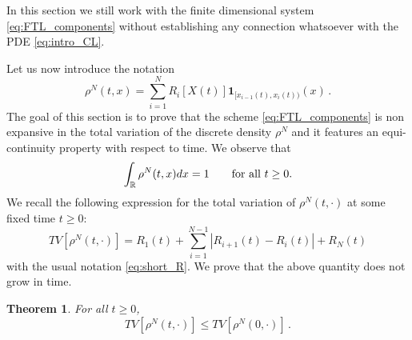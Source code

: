 \documentclass[reqno,oneside]{amsart}
\theoremstyle{plain}
\newtheorem{theorem}{Theorem}[section]
\newcommand{\R}{\mathbb{R}}
\begin{document}
In this section we still work with the finite dimensional system \eqref{eq:FTL_components} without establishing any connection whatsoever  with the PDE \eqref{eq:intro_CL}. 

Let us now introduce the notation
\begin{equation}\label{eq:density_approx}
    \rho^N(t,x)=\sum_{i=1}^{N}R_i[X(t)]\mathbf{1}_{[x_{i-1}(t),x_i(t))}(x)\,.
\end{equation}
The goal of this section is to prove that the scheme \eqref{eq:FTL_components} is non expansive in the total variation of the discrete density $\rho^N$ and it features an equi-continuity property with respect to time. We observe that
\[
\int_{\R}\rho^N(t,x) dx =1\qquad \hbox{for all $t\geq 0$.}
\]
We recall the following expression for the total variation of $\rho^N(t,\cdot)$ at some fixed time $t\geq 0$:
\[TV[\rho^N(t,\cdot)]=R_1(t)+\sum_{i=1}^{N-1}|R_{i+1}(t)-R_i(t)| + R_N(t)\]
with the usual notation \eqref{eq:short_R}. 
We prove that the above quantity does not grow in time.

\begin{theorem}\label{thm:TV}
    For all $t\geq 0$,
    \begin{equation}\label{eq:TV}
        TV[\rho^N(t,\cdot)]\leq TV[\rho^N(0,\cdot)]\,.
    \end{equation}
\end{theorem}
\end{document}
